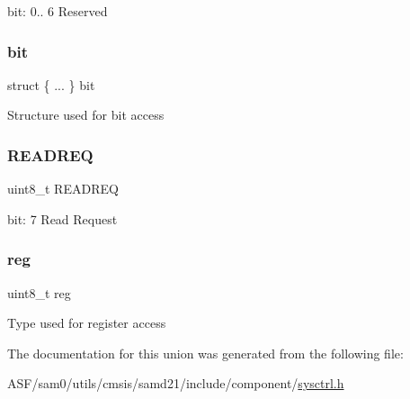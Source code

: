 bit\+: 0.. 6 Reserved \mbox{\label{union_s_y_s_c_t_r_l___d_f_l_l_s_y_n_c___type_a1feeb9943d6ea993b6e735298918ef03}} 
\subsubsection{\texorpdfstring{bit}{bit}}
{\footnotesize\ttfamily struct \{ ... \}   bit}

Structure used for bit access \mbox{\label{union_s_y_s_c_t_r_l___d_f_l_l_s_y_n_c___type_ae62a9ab1343e0f2ae90d9e8bf3c9989b}} 
\subsubsection{\texorpdfstring{READREQ}{READREQ}}
{\footnotesize\ttfamily uint8\+\_\+t R\+E\+A\+D\+R\+EQ}

bit\+: 7 Read Request \mbox{\label{union_s_y_s_c_t_r_l___d_f_l_l_s_y_n_c___type_a9428adc9af4653a2050e2536b55dec8d}} 
\subsubsection{\texorpdfstring{reg}{reg}}
{\footnotesize\ttfamily uint8\+\_\+t reg}

Type used for register access 

The documentation for this union was generated from the following file\+:\begin{DoxyCompactItemize}
\item 
A\+S\+F/sam0/utils/cmsis/samd21/include/component/\mbox{\hyperlink{component_2sysctrl_8h}{sysctrl.\+h}}\end{DoxyCompactItemize}
